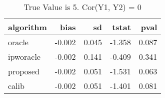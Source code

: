 \begin{table}[h!]

\caption{True Value is 5. Cor(Y1, Y2) = 0}
\centering
\begin{tabular}[t]{lrrrr}
\toprule
algorithm & bias & sd & tstat & pval\\
\midrule
oracle & -0.002 & 0.045 & -1.358 & 0.087\\
ipworacle & -0.002 & 0.141 & -0.409 & 0.341\\
proposed & -0.002 & 0.051 & -1.531 & 0.063\\
calib & -0.002 & 0.051 & -1.401 & 0.081\\
\bottomrule
\end{tabular}
\end{table}
